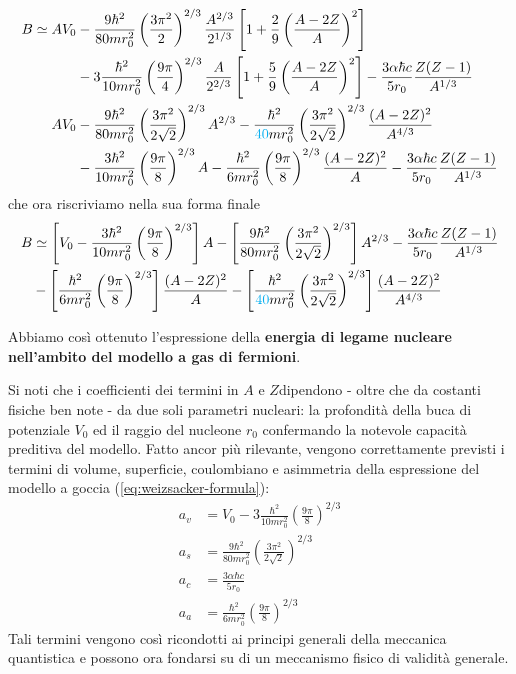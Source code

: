 \begin{align*}
	B \simeq A V_{0} &- \frac{9\hbar^{2}}{80 mr_{0}^{2}}\left( \frac{3\pi^{2}}{2} \right)^{2/3} \frac{A^{2/3}}{2^{1/3}}  \left[ 1+ \frac{2}{9} \left( \frac{A-2Z}{A} \right)^{2} \right] \\
	&- 3 \frac{\hbar^{2}}{10 m r_{0}^{2}} \left( \frac{9\pi}{4} \right)^{2/3} \frac{A}{2^{2/3}}  \left[ 1 + \frac{5}{9} \left( \frac{A-2Z}{A} \right)^{2} \right] - \frac{3 \alpha \hbar c}{5 r_{0}} \frac{Z(Z-1)}{A^{1/3}} \\
	AV_{0} &- \frac{9\hbar^{2}}{80mr_{0}^{2}} \left( \frac{3\pi^{2}}{2\sqrt{ 2 }} \right)^{2/3} A^{2/3} - \frac{\hbar^{2}}{\textcolor{cyan}{40} m r_{0}^{2}} \left( \frac{3\pi^{2}}{2\sqrt{ 2 }} \right)^{2/3} \frac{(A-2Z)^{2}}{A^{4/3}} \\
	&- \frac{3\hbar^{2}}{10mr_{0}^{2}} \left( \frac{9\pi}{8} \right)^{2/3}A - \frac{\hbar^{2}}{6mr_{0}^{2}} \left( \frac{9\pi}{8} \right)^{2/3} \frac{(A-2Z)^{2}}{A} - \frac{3 \alpha \hbar c}{5 r_{0}} \frac{Z(Z-1)}{A^{1/3}}
\end{align*}
che ora riscriviamo nella sua forma finale
\begin{align}
		B &\simeq \left[ V_{0} - \frac{3\hbar^{2}}{10mr_{0}^{2}} \left( \frac{9\pi}{8} \right)^{2/3} \right] A - \left[ \frac{9\hbar^{2}}{80mr_{0}^{2}} \left( \frac{3\pi^{2}}{2\sqrt{ 2 }} \right)^{2/3} \right]A^{2/3}
	- \frac{3 \alpha \hbar c}{5 r_{0}} \frac{Z(Z-1)}{A^{1/3}} \nonumber \\
	&- \left[ \frac{\hbar^{2}}{6mr_{0}^{2}} \left( \frac{9\pi}{8} \right)^{2/3}  \right]\frac{(A-2Z)^{2}}{A}
	- \left[ \frac{\hbar^{2}}{\textcolor{cyan}{40} m r_{0}^{2}} \left( \frac{3\pi^{2}}{2\sqrt{ 2 }} \right)^{2/3} \right] \frac{(A-2Z)^{2}}{A^{4/3}}
	\label{eq:binding-energy-expression-fermi-gas-model}
\end{align}


Abbiamo così ottenuto l’espressione della \textbf{energia di legame nucleare nell’ambito del modello a gas di fermioni}.

Si noti che i coefficienti dei termini in $A$ e $Z $dipendono - oltre che da costanti fisiche ben note - da due soli parametri nucleari:
la profondità della buca di potenziale $V_{0}$ ed il raggio del nucleone $r_{0}$ confermando la notevole capacità preditiva del modello. 
Fatto ancor più rilevante, vengono correttamente previsti i termini di volume, superficie, coulombiano e asimmetria della 
espressione del modello a goccia (\ref{eq:weizsacker-formula}):
\begin{align*}
	a_{v} &= V_{0} - 3 \frac{\hbar^{2}}{10 m r_{0}^{2}} \left( \frac{9\pi}{8} \right)^{2/3} \\
	a_{s} &= \frac{9\hbar^{2}}{80 m r_{0}^{2}} \left(  \frac{3\pi^{2}}{2\sqrt{ 2 }} \right)^{2/3} \\
	a_{c} &= \frac{3 \alpha \hbar c}{5 r_{0}} \\
	a_{a} &= \frac{\hbar^{2}}{6 m r_{0}^{2}} \left(\frac{9\pi}{8} \right)^{2/3}
\end{align*}
Tali termini vengono così ricondotti ai principi generali della meccanica quantistica e possono ora fondarsi su di un meccanismo fisico di validità generale.


